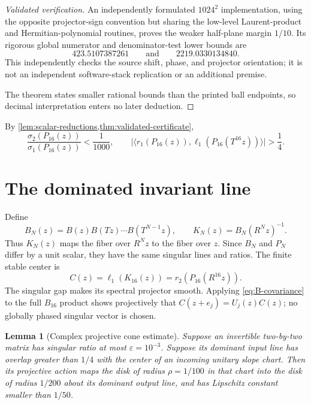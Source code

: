 \documentclass[10pt,a4paper]{amsart}
\numberwithin{equation}{section}
\newtheorem{lemma}[theorem]{Lemma}
\newcommand{\ip}[2]{\langle #1,#2\rangle}
\newcommand{\abs}[1]{\lvert #1\rvert}
\begin{document}
\begin{proof}[Validated verification]
An independently formulated $1024^2$ implementation, using the opposite
projector-sign convention but sharing the low-level Laurent-product and
Hermitian-polynomial routines, proves the weaker half-plane margin $1/10$.
Its rigorous global numerator and denominator-test lower bounds are
\[
 423.5107387261\qquad\text{and}\qquad2219.0330134840.
\]
This independently checks the source shift, phase, and projector orientation;
it is not an independent software-stack replication or an additional premise.

The theorem states smaller rational bounds than the printed ball endpoints,
so decimal interpretation enters no later deduction.
\end{proof}


By \cref{lem:scalar-reductions,thm:validated-certificate},
\begin{equation}\label{eq:domination-and-junction}
 \frac{\sigma_2(P_{16}(z))}{\sigma_1(P_{16}(z))}<\frac1{1000},\qquad
 \abs{\ip{r_1(P_{16}(z))}{\ell_1(P_{16}(T^{16}z))}}>\frac14.
\end{equation}

\section{The dominated invariant line}
\label{sec:domination}

Define
\begin{equation}\label{eq:BN-KN}
 B_N(z)=B(z)B(Tz)\cdots B(T^{N-1}z),\qquad
 K_N(z)=B_N(R^N z)^{-1}.
\end{equation}
Thus $K_N(z)$ maps the fiber over $R^N z$ to the fiber over $z$.  Since
$B_N$ and $P_N$ differ by a unit scalar, they have the same singular lines
and ratios.  The finite stable center is
\[
 C(z)=\ell_1(K_{16}(z))=r_2(P_{16}(R^{16}z)).
\]
The singular gap makes its spectral projector smooth.  Applying
\eqref{eq:B-covariance} to the full $B_{16}$ product shows projectively that
$C(z+e_j)=U_j(z)C(z)$; no globally phased singular vector is chosen.

\begin{lemma}[Complex projective cone estimate]\label{lem:cone}
Suppose an invertible two-by-two matrix has singular ratio at most
$\varepsilon=10^{-3}$.  Suppose its dominant input line has overlap greater
than $1/4$ with the center of an incoming unitary slope chart.  Then its
projective action maps the disk of radius $\rho=1/100$ in that chart into the
disk of radius $1/200$ about its dominant output line, and has Lipschitz
constant smaller than $1/50$.
\end{lemma}
\end{document}

